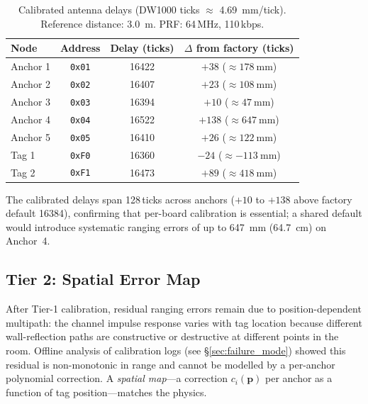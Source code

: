 \begin{table}[h]
  \centering
  \caption{Calibrated antenna delays (DW1000 ticks $\approx$ \SI{4.69}{\milli\metre}/tick).
  Reference distance: \SI{3.0}{\metre}. PRF: 64\,MHz, 110\,kbps.}
  \label{tab:ant_delays}
  \begin{tabular}{lccc}
    \toprule
    Node & Address & Delay (ticks) & $\Delta$ from factory (ticks) \\
    \midrule
    Anchor 1 & \texttt{0x01} & 16422 & $+38$ ($\approx\SI{178}{\milli\metre}$) \\
    Anchor 2 & \texttt{0x02} & 16407 & $+23$ ($\approx\SI{108}{\milli\metre}$) \\
    Anchor 3 & \texttt{0x03} & 16394 & $+10$ ($\approx\SI{47}{\milli\metre}$)  \\
    Anchor 4 & \texttt{0x04} & 16522 & $+138$ ($\approx\SI{647}{\milli\metre}$) \\
    Anchor 5 & \texttt{0x05} & 16410 & $+26$ ($\approx\SI{122}{\milli\metre}$) \\
    Tag 1    & \texttt{0xF0} & 16360 & $-24$ ($\approx\SI{-113}{\milli\metre}$) \\
    Tag 2    & \texttt{0xF1} & 16473 & $+89$ ($\approx\SI{418}{\milli\metre}$) \\
    \bottomrule
  \end{tabular}
\end{table}

The calibrated delays span 128\,ticks across anchors ($+10$ to $+138$ above
factory default 16384), confirming that per-board calibration is essential;
a shared default would introduce systematic ranging errors of up to
\SI{647}{\milli\metre} (\SI{64.7}{\centi\metre}) on Anchor~4.

\subsection{Tier 2: Spatial Error Map}
\label{sec:tier2}

After Tier-1 calibration, residual ranging errors remain due to
position-dependent multipath: the channel impulse response varies with
tag location because different wall-reflection paths are constructive or
destructive at different points in the room.
Offline analysis of calibration logs (see \S\ref{sec:failure_mode}) showed
this residual is non-monotonic in range and cannot be modelled by a
per-anchor polynomial correction.
A \emph{spatial map}---a correction $c_i(\mathbf{p})$ per anchor as a
function of tag position---matches the physics.

